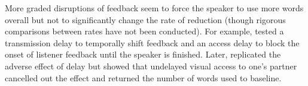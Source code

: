 More graded disruptions of feedback seem to force the speaker to use more words overall but not to significantly change the rate of reduction (though rigorous comparisons between rates have not been conducted). For example,  tested a transmission delay to temporally shift feedback and an access delay to block the onset of listener feedback until the speaker is finished. Later,  replicated the adverse effect of delay but showed that undelayed visual access to one's partner cancelled out the effect and returned the number of words used to baseline. 

